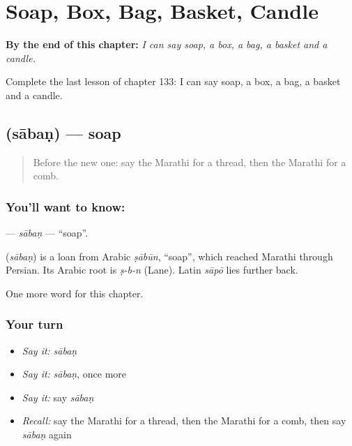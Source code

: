 
\chapter{Soap, Box, Bag, Basket, Candle}
\label{ch:mr-soap-box-bag-basket-candle}

\begin{chapteropening}
\textbf{By the end of this chapter:} \emph{I can say soap, a box, a bag, a basket and a candle.}

Complete the last lesson of chapter 133: I can say soap, a box, a bag, a basket and a candle.
\end{chapteropening}

\section[\texorpdfstring{\mr{साबण} (sābaṇ)}{साबण (sābaṇ)}]{ (sābaṇ) — soap}

\label{lesson:MR-C133-saban}



\begin{quote}
Before the new one: say the Marathi for a thread, then the Marathi for a comb.
\end{quote}

\subsection*{You'll want to know: }
\textbf{} — \emph{sābaṇ} — \textquotedblleft{}soap\textquotedblright{}.

\begin{cousinweb}
\textbf{} (\emph{sābaṇ}) is a loan from Arabic \emph{ṣābūn}, \textquotedblleft{}soap\textquotedblright{}, which reached Marathi through Persian. Its Arabic root is \emph{ṣ-b-n} (Lane). Latin \emph{sāpō} lies further back.
\end{cousinweb}

\begin{grammarlens}[title={What you've built}]
One more word for this chapter.
\end{grammarlens}

\subsection*{Your turn}
\begin{itemize}
\raggedright
  \item \emph{Say it:} \emph{sābaṇ}
  \item \emph{Say it:} \emph{sābaṇ}, once more
  \item \emph{Say it:} say \emph{sābaṇ}
  \item \emph{Recall:} say the Marathi for a thread, then the Marathi for a comb, then say \emph{sābaṇ} again
\end{itemize}

